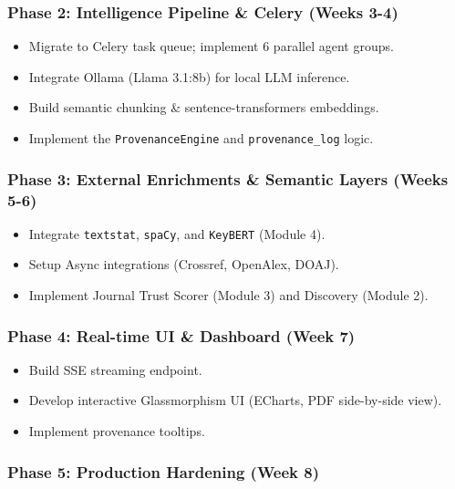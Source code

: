 \documentclass[
]{article}
\providecommand{\tightlist}{%
  \setlength{\itemsep}{0pt}\setlength{\parskip}{0pt}}
\begin{document}
\subsubsection{Phase 2: Intelligence Pipeline \& Celery (Weeks
3-4)}\label{phase-2-intelligence-pipeline-celery-weeks-3-4}

\begin{itemize}
\tightlist
\item
  Migrate to Celery task queue; implement 6 parallel agent groups.
\item
  Integrate Ollama (Llama 3.1:8b) for local LLM inference.
\item
  Build semantic chunking \& sentence-transformers embeddings.
\item
  Implement the \texttt{ProvenanceEngine} and \texttt{provenance\_log}
  logic.
\end{itemize}

\subsubsection{Phase 3: External Enrichments \& Semantic Layers (Weeks
5-6)}\label{phase-3-external-enrichments-semantic-layers-weeks-5-6}

\begin{itemize}
\tightlist
\item
  Integrate \texttt{textstat}, \texttt{spaCy}, and \texttt{KeyBERT}
  (Module 4).
\item
  Setup Async integrations (Crossref, OpenAlex, DOAJ).
\item
  Implement Journal Trust Scorer (Module 3) and Discovery (Module 2).
\end{itemize}

\subsubsection{Phase 4: Real-time UI \& Dashboard (Week
7)}\label{phase-4-real-time-ui-dashboard-week-7}

\begin{itemize}
\tightlist
\item
  Build SSE streaming endpoint.
\item
  Develop interactive Glassmorphism UI (ECharts, PDF side-by-side view).
\item
  Implement provenance tooltips.
\end{itemize}

\subsubsection{Phase 5: Production Hardening (Week
8)}\label{phase-5-production-hardening-week-8}
\end{document}
